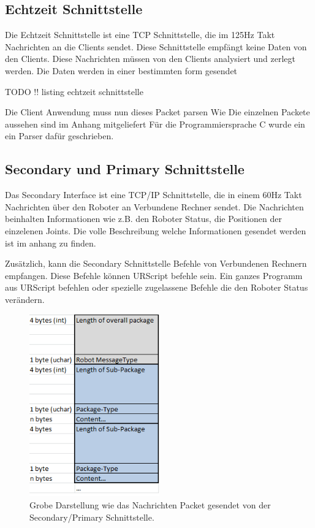 \subsection{Echtzeit Schnittstelle}
\label{urcontrol_rci_gru}

Die Echtzeit Schnittstelle ist eine TCP Schnittstelle, die im 125Hz Takt Nachrichten an die Clients sendet. Diese Schnittstelle empfängt keine Daten von den Clients. Diese Nachrichten müssen von den Clients analysiert und zerlegt werden. Die Daten werden in einer bestimmten form gesendet

TODO !! listing echtzeit schnittstelle

Die Client Anwendung muss nun dieses Packet \ac{parsen}
Wie Die einzelnen Packete aussehen sind im Anhang mitgeliefert
Für die Programmiersprache C wurde ein ein Parser dafür geschrieben.

\subsection{Secondary und Primary Schnittstelle}
\label{urcontrol_spi_gru}

Das Secondary Interface ist eine \ac{TCP/IP} Schnittstelle, die in einem 60Hz Takt Nachrichten über den Roboter an Verbundene Rechner sendet.
Die Nachrichten beinhalten Informationen wie z.B. den Roboter Status, die Positionen der einzelenen Joints.
Die volle Beschreibung welche Informationen gesendet werden ist im anhang zu finden.

Zusätzlich, kann die Secondary Schnittstelle Befehle von Verbundenen Rechnern empfangen. 
Diese Befehle können URScript befehle sein. Ein ganzes Programm aus URScript befehlen oder spezielle zugelassene Befehle die den Roboter Status verändern.

\begin{figure}[ht]
  \centering
    \includegraphics[width=0.5\textwidth]{pic/secondary_datapackage_scheme.png}
      \caption[Schema des Datenpackets gesendet von der Secondary Schnittstelle]{Grobe Darstellung wie das Nachrichten Packet gesendet von der Secondary/Primary Schnittstelle.}
      \label{fig:datascheme_of_secondary_interface}
\end{figure}

